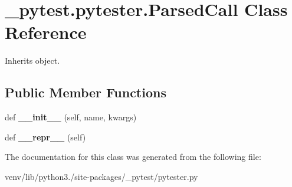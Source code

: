 \hypertarget{class__pytest_1_1pytester_1_1_parsed_call}{}\section{\+\_\+pytest.\+pytester.\+Parsed\+Call Class Reference}
\label{class__pytest_1_1pytester_1_1_parsed_call}


Inherits object.

\subsection*{Public Member Functions}
\begin{DoxyCompactItemize}
\item 
\mbox{\label{class__pytest_1_1pytester_1_1_parsed_call_a29fadd6e7bcdd5679a17d461241089b5}} 
def {\bfseries \+\_\+\+\_\+init\+\_\+\+\_\+} (self, name, kwargs)
\item 
\mbox{\label{class__pytest_1_1pytester_1_1_parsed_call_a1c5886fca8a880bbd1e2c857025cff35}} 
def {\bfseries \+\_\+\+\_\+repr\+\_\+\+\_\+} (self)
\end{DoxyCompactItemize}


The documentation for this class was generated from the following file\+:\begin{DoxyCompactItemize}
\item 
venv/lib/python3./site-\/packages/\+\_\+pytest/pytester.\+py\end{DoxyCompactItemize}
